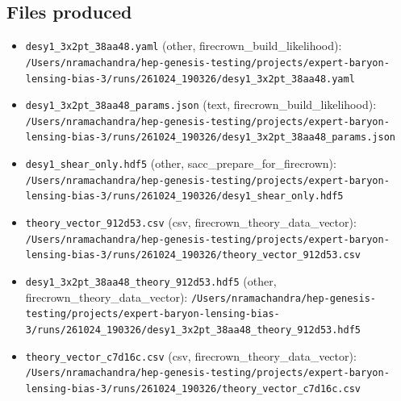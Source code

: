 \documentclass[11pt,a4paper]{article}
\begin{document}
\subsection{Files produced}
\begin{itemize}
  \item \texttt{desy1\_\allowbreak{}3x2pt\_\allowbreak{}38aa48.yaml} (other, firecrown\_build\_likelihood): \texttt{/\allowbreak{}Users/\allowbreak{}nramachandra/\allowbreak{}hep-genesis-testing/\allowbreak{}projects/\allowbreak{}expert-baryon-lensing-bias-3/\allowbreak{}runs/\allowbreak{}261024\_\allowbreak{}190326/\allowbreak{}desy1\_\allowbreak{}3x2pt\_\allowbreak{}38aa48.yaml}
  \item \texttt{desy1\_\allowbreak{}3x2pt\_\allowbreak{}38aa48\_\allowbreak{}params.json} (text, firecrown\_build\_likelihood): \texttt{/\allowbreak{}Users/\allowbreak{}nramachandra/\allowbreak{}hep-genesis-testing/\allowbreak{}projects/\allowbreak{}expert-baryon-lensing-bias-3/\allowbreak{}runs/\allowbreak{}261024\_\allowbreak{}190326/\allowbreak{}desy1\_\allowbreak{}3x2pt\_\allowbreak{}38aa48\_\allowbreak{}params.json}
  \item \texttt{desy1\_\allowbreak{}shear\_\allowbreak{}only.hdf5} (other, sacc\_prepare\_for\_firecrown): \texttt{/\allowbreak{}Users/\allowbreak{}nramachandra/\allowbreak{}hep-genesis-testing/\allowbreak{}projects/\allowbreak{}expert-baryon-lensing-bias-3/\allowbreak{}runs/\allowbreak{}261024\_\allowbreak{}190326/\allowbreak{}desy1\_\allowbreak{}shear\_\allowbreak{}only.hdf5}
  \item \texttt{theory\_\allowbreak{}vector\_\allowbreak{}912d53.csv} (csv, firecrown\_theory\_data\_vector): \texttt{/\allowbreak{}Users/\allowbreak{}nramachandra/\allowbreak{}hep-genesis-testing/\allowbreak{}projects/\allowbreak{}expert-baryon-lensing-bias-3/\allowbreak{}runs/\allowbreak{}261024\_\allowbreak{}190326/\allowbreak{}theory\_\allowbreak{}vector\_\allowbreak{}912d53.csv}
  \item \texttt{desy1\_\allowbreak{}3x2pt\_\allowbreak{}38aa48\_\allowbreak{}theory\_\allowbreak{}912d53.hdf5} (other, firecrown\_theory\_data\_vector): \texttt{/\allowbreak{}Users/\allowbreak{}nramachandra/\allowbreak{}hep-genesis-testing/\allowbreak{}projects/\allowbreak{}expert-baryon-lensing-bias-3/\allowbreak{}runs/\allowbreak{}261024\_\allowbreak{}190326/\allowbreak{}desy1\_\allowbreak{}3x2pt\_\allowbreak{}38aa48\_\allowbreak{}theory\_\allowbreak{}912d53.hdf5}
  \item \texttt{theory\_\allowbreak{}vector\_\allowbreak{}c7d16c.csv} (csv, firecrown\_theory\_data\_vector): \texttt{/\allowbreak{}Users/\allowbreak{}nramachandra/\allowbreak{}hep-genesis-testing/\allowbreak{}projects/\allowbreak{}expert-baryon-lensing-bias-3/\allowbreak{}runs/\allowbreak{}261024\_\allowbreak{}190326/\allowbreak{}theory\_\allowbreak{}vector\_\allowbreak{}c7d16c.csv}

\end{itemize}
\end{document}
